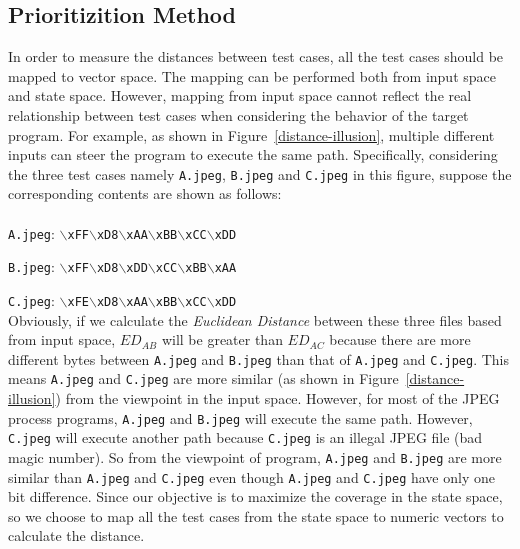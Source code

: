 \subsection{Prioritizition Method}
In order to measure the distances between test cases, all the test cases should be mapped to vector space. 
The mapping can be performed both from input space and state space. However, mapping from input space cannot reflect the real relationship between test cases when considering the behavior of the target program. For example, as shown in Figure~\ref{distance-illusion}, multiple different inputs can steer the program to execute the same path. Specifically, considering the three test cases namely \texttt{A.jpeg}, \texttt{B.jpeg} and \texttt{C.jpeg} in this figure, suppose the corresponding contents are shown as follows:
\\
\\
\indent\texttt{A.jpeg}: \texttt{$\backslash$xFF$\backslash$xD8$\backslash$xAA$\backslash$xBB$\backslash$xCC$\backslash$xDD}

\texttt{B.jpeg}: \texttt{$\backslash$xFF$\backslash$xD8$\backslash$xDD$\backslash$xCC$\backslash$xBB$\backslash$xAA}

\texttt{C.jpeg}: \texttt{$\backslash$xFE$\backslash$xD8$\backslash$xAA$\backslash$xBB$\backslash$xCC$\backslash$xDD}
\\

\indent Obviously, if we calculate the \textit{Euclidean Distance} between these three files based from input space, $ED_{AB}$ will be greater than $ED_{AC}$ because there are more different bytes between \texttt{A.jpeg} and \texttt{B.jpeg} than that of \texttt{A.jpeg} and \texttt{C.jpeg}. This means \texttt{A.jpeg} and \texttt{C.jpeg} are more similar (as shown in Figure~\ref{distance-illusion}) from the viewpoint in the input space. 
However, for most of the JPEG process programs, \texttt{A.jpeg} and \texttt{B.jpeg} will execute the same path. However, \texttt{C.jpeg} will execute another path because \texttt{C.jpeg} is an illegal JPEG file (bad magic number). So from the viewpoint of program, \texttt{A.jpeg} and \texttt{B.jpeg} are more similar than \texttt{A.jpeg} and \texttt{C.jpeg} even though \texttt{A.jpeg} and \texttt{C.jpeg} have only one bit difference. 
Since our objective is to maximize the coverage in the state space, so we choose to map all the test cases from the state space to numeric vectors to calculate the distance.

